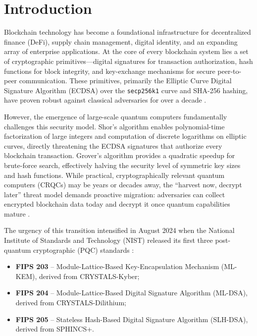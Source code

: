 \documentclass[12pt, a4paper, twocolumn]{article}
\begin{document}
\section{Introduction}
\label{sec:introduction}

Blockchain technology has become a foundational infrastructure for decentralized finance (DeFi), supply chain management, digital identity, and an expanding array of enterprise applications. At the core of every blockchain system lies a set of cryptographic primitives---digital signatures for transaction authorization, hash functions for block integrity, and key-exchange mechanisms for secure peer-to-peer communication. These primitives, primarily the Elliptic Curve Digital Signature Algorithm (ECDSA) over the \texttt{secp256k1} curve and SHA-256 hashing, have proven robust against classical adversaries for over a decade \cite{nakamoto2008bitcoin, buterin2014ethereum}.

However, the emergence of large-scale quantum computers fundamentally challenges this security model. Shor's algorithm \cite{shor1997polynomial} enables polynomial-time factorization of large integers and computation of discrete logarithms on elliptic curves, directly threatening the ECDSA signatures that authorize every blockchain transaction. Grover's algorithm \cite{grover1996fast} provides a quadratic speedup for brute-force search, effectively halving the security level of symmetric key sizes and hash functions. While practical, cryptographically relevant quantum computers (CRQCs) may be years or decades away, the ``harvest now, decrypt later'' threat model demands proactive migration: adversaries can collect encrypted blockchain data today and decrypt it once quantum capabilities mature \cite{mosca2018cybersecurity}.

The urgency of this transition intensified in August 2024 when the National Institute of Standards and Technology (NIST) released its first three post-quantum cryptographic (PQC) standards \cite{nist2024pqc}:

\begin{itemize}[noitemsep]
  \item \textbf{FIPS 203} -- Module-Lattice-Based Key-Encapsulation Mechanism (ML-KEM), derived from CRYSTALS-Kyber;
  \item \textbf{FIPS 204} -- Module-Lattice-Based Digital Signature Algorithm (ML-DSA), derived from CRYSTALS-Dilithium;
  \item \textbf{FIPS 205} -- Stateless Hash-Based Digital Signature Algorithm (SLH-DSA), derived from SPHINCS+.
\end{itemize}
\end{document}

